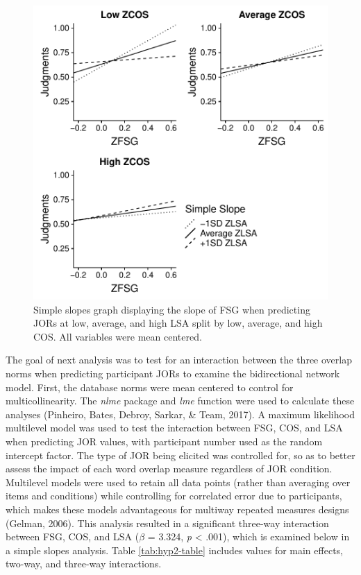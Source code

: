 \documentclass[english,,man]{apa6}
\begin{document}
\begin{figure}[htbp]
\centering
\includegraphics{max_buch_JOL_files/figure-latex/hyp2graph-1.pdf}
\caption{\label{fig:hyp2graph}Simple slopes graph displaying the slope of
FSG when predicting JORs at low, average, and high LSA split by low,
average, and high COS. All variables were mean centered.}
\end{figure}

The goal of next analysis was to test for an interaction between the
three overlap norms when predicting participant JORs to examine the
bidirectional network model. First, the database norms were mean
centered to control for multicollinearity. The \emph{nlme} package and
\emph{lme} function were used to calculate these analyses (Pinheiro,
Bates, Debroy, Sarkar, \& Team, 2017). A maximum likelihood multilevel
model was used to test the interaction between FSG, COS, and LSA when
predicting JOR values, with participant number used as the random
intercept factor. The type of JOR being elicited was controlled for, so
as to better assess the impact of each word overlap measure regardless
of JOR condition. Multilevel models were used to retain all data points
(rather than averaging over items and conditions) while controlling for
correlated error due to participants, which makes these models
advantageous for multiway repeated measures designs (Gelman, 2006). This
analysis resulted in a significant three-way interaction between FSG,
COS, and LSA (\(\beta\) = 3.324, \emph{p} \textless{} .001), which is
examined below in a simple slopes analysis. Table \ref{tab:hyp2-table}
includes values for main effects, two-way, and three-way interactions.
\end{document}
